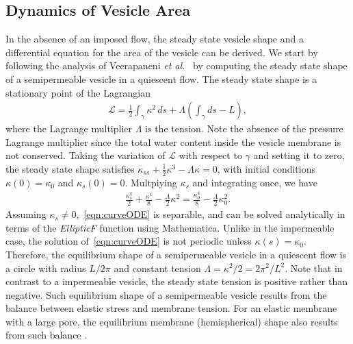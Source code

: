 \documentclass[prb,preprint,showpacs,preprintnumbers,amsmath,amssymb,longbibliography]{revtex4-1}
\begin{document}
\subsection{Dynamics of Vesicle Area\label{subsec:area_dynamics}}
In the absence of an imposed flow, the steady state vesicle shape and a
differential equation for the area of the vesicle can be derived. We
start by following the analysis of Veerapaneni {\em et
al.}~\cite{vee-raj-bir-pur2009} by computing the steady state shape of a
semipermeable vesicle in a quiescent flow. The steady state shape is a
stationary point of the Lagrangian
\begin{align}
  \mathcal{L} = \frac{1}{2}\int_{\gamma} \kappa^2 \, ds +
    \Lambda \left(\int_{\gamma} ds  - L \right),
\end{align}
where the Lagrange multiplier $\Lambda$ is the tension. Note the absence
of the pressure Lagrange multiplier since the total water content inside the vesicle membrane is not conserved.
Taking the variation of $\mathcal{L}$ with respect to $\gamma$ and
setting it to zero, the steady state shape satisfies $\kappa_{ss} +
\frac{1}{2}\kappa^3 - \Lambda \kappa = 0$, with initial conditions
$\kappa(0) = \kappa_0$ and $\kappa_s(0) = 0$.  Multpiying $\kappa_s$ and integrating once, we have
\begin{align}
  \frac{\kappa_s^2}{2} + \frac{\kappa^4}{8} - 
    \frac{\Lambda}{2}\kappa^2 = \frac{\kappa_0^4}{8} - 
    \frac{\Lambda}{2}\kappa_0^2.
  \label{eqn:curveODE}
\end{align}
Assuming $\kappa_s \neq 0$,~\eqref{eqn:curveODE} is separable, and can
be solved analytically in terms of the {\em EllipticF} function using
Mathematica. Unlike in the impermeable case, the solution
of~\eqref{eqn:curveODE} is not periodic unless $\kappa(s) = \kappa_0$.
Therefore, the equilibrium shape of a semipermeable vesicle in a
quiescent flow is a circle with radius $L/2\pi$ and constant tension
$\Lambda = \kappa^2/2 = 2\pi^2/L^2.$ Note that in contrast to a
impermeable vesicle, the steady state tension is positive rather than
negative. Such equilibrium shape of a semipermeable vesicle results from the balance between elastic stress and membrane tension. 
For an elastic membrane with a large pore, the equilibrium membrane (hemispherical) shape also results from such balance \cite{Ryham2018_JFM}.
\end{document}
